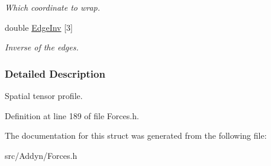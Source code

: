 \begin{DoxyCompactItemize}
\begin{DoxyCompactList}\small\item\em Which coordinate to wrap. \end{DoxyCompactList}\item 
double \hyperlink{structTENS_a8deae0979f1ffa0ff0b1976cee071f39}{Edge\+Inv} \mbox{[}3\mbox{]}\hypertarget{structTENS_a8deae0979f1ffa0ff0b1976cee071f39}{}\label{structTENS_a8deae0979f1ffa0ff0b1976cee071f39}

\begin{DoxyCompactList}\small\item\em Inverse of the edges. \end{DoxyCompactList}\end{DoxyCompactItemize}


\subsubsection{Detailed Description}
Spatial tensor profile. 

Definition at line 189 of file Forces.\+h.



The documentation for this struct was generated from the following file\+:\begin{DoxyCompactItemize}
\item 
src/\+Addyn/Forces.\+h\end{DoxyCompactItemize}
